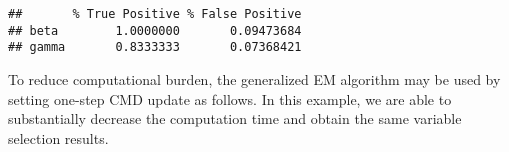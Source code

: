 \begin{Shaded}
\begin{Highlighting}[]
\StringTok{ }
\StringTok{ }
        \NormalTok{(}\NormalTok{ =}\StringTok{ }\NormalTok{(b[b0 }\OperatorTok{!=}\StringTok{ }\NormalTok{] }\OperatorTok{!=}\StringTok{ }\NormalTok{),}
          \NormalTok{ =}\StringTok{ }\NormalTok{(b[b0 }\OperatorTok{==}\StringTok{ }\NormalTok{] }\OperatorTok{!=}\StringTok{ }\NormalTok{))}
\NormalTok{    \}}
    \NormalTok{(} \NormalTok{(}\OperatorTok{$}
           \NormalTok{(}\OperatorTok{$}
\NormalTok{\}}
\end{Highlighting}
\end{Shaded}

\begin{verbatim}
##       % True Positive % False Positive
## beta        1.0000000       0.09473684
## gamma       0.8333333       0.07368421
\end{verbatim}

To reduce computational burden, the generalized EM algorithm may be used
by setting one-step CMD update as follows. In this example, we are able
to substantially decrease the computation time and obtain the same
variable selection results.

\begin{Shaded}
\begin{Highlighting}[]
\NormalTok{(\{}
\StringTok{ }\NormalTok{(}
        \OperatorTok{$}\OperatorTok{$}
         \NormalTok{, } \NormalTok{,}
         \NormalTok{, } \NormalTok{,}
         \NormalTok{, } 
\NormalTok{    )}
\NormalTok{\})}
\end{Highlighting}
\end{Shaded}

